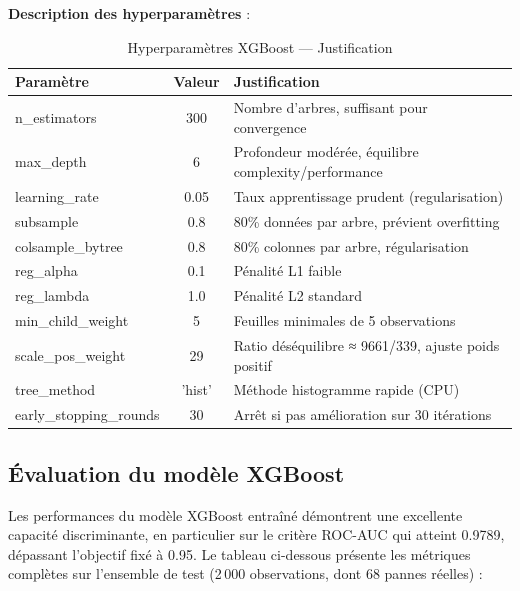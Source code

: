 \documentclass[a4paper,12pt]{report}
\begin{document}
\textbf{Description des hyperparamètres} :

\begin{table}[H]
\centering
\small
\caption{Hyperparamètres XGBoost — Justification}
\begin{tabular}{|l|c|l|}
\hline
\textbf{Paramètre} & \textbf{Valeur} & \textbf{Justification} \\
\hline\hline
n\_estimators & 300 & Nombre d'arbres, suffisant pour convergence \\
\hline
max\_depth & 6 & Profondeur modérée, équilibre complexity/performance \\
\hline
learning\_rate & 0.05 & Taux apprentissage prudent (regularisation) \\
\hline
subsample & 0.8 & 80\% données par arbre, prévient overfitting \\
\hline
colsample\_bytree & 0.8 & 80\% colonnes par arbre, régularisation \\
\hline
reg\_alpha & 0.1 & Pénalité L1 faible \\
\hline
reg\_lambda & 1.0 & Pénalité L2 standard \\
\hline
min\_child\_weight & 5 & Feuilles minimales de 5 observations \\
\hline
scale\_pos\_weight & 29 & Ratio déséquilibre ≈ 9661/339, ajuste poids positif \\
\hline
tree\_method & 'hist' & Méthode histogramme rapide (CPU) \\
\hline
early\_stopping\_rounds & 30 & Arrêt si pas amélioration sur 30 itérations \\
\hline
\end{tabular}
\end{table}

\subsection{Évaluation du modèle XGBoost}

Les performances du modèle XGBoost entraîné démontrent une excellente capacité discriminante,
en particulier sur le critère ROC-AUC qui atteint 0.9789, dépassant l'objectif fixé à 0.95.
Le tableau ci-dessous présente les métriques complètes sur l'ensemble de test (2\,000 observations,
dont 68 pannes réelles) :
\end{document}
